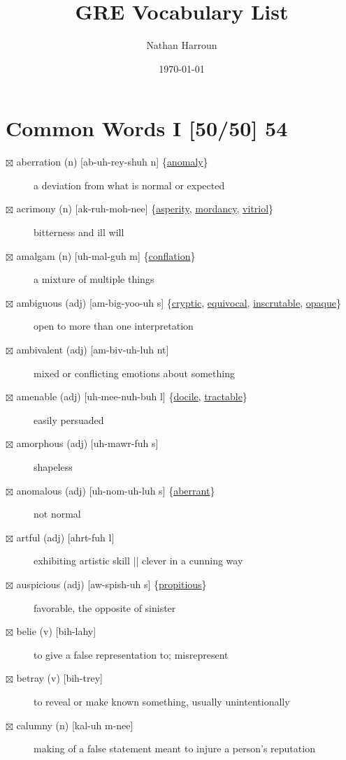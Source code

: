\documentclass[11pt]{article}
\author{Nathan Harroun}
\date{\today}
\title{GRE Vocabulary List}
\begin{document}
\maketitle
\tableofcontents

\section{Common Words I [50/50] 54}
\label{sec:org2fa2e1e}
\begin{description}
\item[{$\boxtimes$ \label{org7fb3d6a}aberration (n) [ab-uh-rey-shuh n] \{\hyperref[orgdebccc3]{anomaly}\}}] a deviation from what is normal or expected
\item[{$\boxtimes$ \label{orgd57c0d6}acrimony (n) [ak-ruh-moh-nee] \{\hyperref[org05c04a3]{asperity}, \hyperref[org0780d5c]{mordancy}, \hyperref[org7cc1ee9]{vitriol}\}}] bitterness and ill will
\item[{$\boxtimes$ amalgam (n) [uh-mal-guh m] \{\hyperref[org3b11bb2]{conflation}\}}] a mixture of multiple things
\item[{$\boxtimes$ \label{orgc4611e5}ambiguous (adj) [am-big-yoo-uh s] \{\hyperref[org55b5c86]{cryptic}, \hyperref[orgd229018]{equivocal}, \hyperref[org3d97e2d]{inscrutable}, \hyperref[org26d66c4]{opaque}\}}] open to more than one interpretation
\item[{$\boxtimes$ \label{org84d4064}ambivalent (adj) [am-biv-uh-luh nt]}] mixed or conflicting emotions about something
\item[{$\boxtimes$ \label{orgfe6eaea}amenable (adj) [uh-mee-nuh-buh l] \{\hyperref[orgee81bd2]{docile}, \hyperref[org8bff33c]{tractable}\}}] easily persuaded
\item[{$\boxtimes$ amorphous (adj) [uh-mawr-fuh s]}] shapeless
\item[{$\boxtimes$ \label{org463dd3f}anomalous (adj) [uh-nom-uh-luh s] \{\hyperref[org9b5d490]{aberrant}\}}] not normal
\item[{$\boxtimes$ artful (adj) [ahrt-fuh l]}] exhibiting artistic skill || clever in a cunning way
\item[{$\boxtimes$ \label{orgd0e8f52}auspicious (adj) [aw-spish-uh s] \{\hyperref[orgf063ff6]{propitious}\}}] favorable, the opposite of sinister
\item[{$\boxtimes$ belie (v) [bih-lahy]}] to give a false representation to; misrepresent
\item[{$\boxtimes$ betray (v) [bih-trey]}] to reveal or make known something, usually unintentionally
\item[{$\boxtimes$ \label{orgb9e575e} calumny (n) [kal-uh m-nee]}] making of a false statement meant to injure a person's reputation

\end{description}
\end{document}
